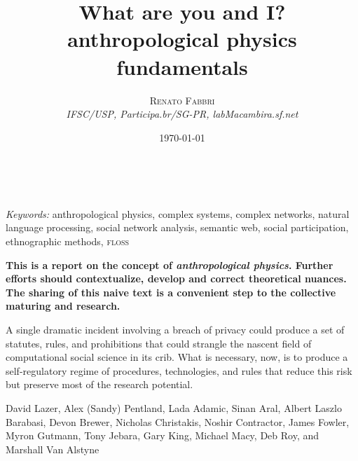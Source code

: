 \documentclass[a4paper, 11pt]{article} %
\title{\textbf{What are you and I?}\\ %
anthropological physics fundamentals} %
\author{\textsc{Renato Fabbri} %
\\{\textit{IFSC/USP, Participa.br/SG-PR, labMacambira.sf.net}}} %
\date{\today} %
\makeatletter
\newcommand{\floss}{\textsc{floss}}
\renewcommand{\maketitle}{ %
\begin{flushright} %
{\LARGE\@title} %

\vspace{50pt} %

{\large\@author} %
\\\@date %

\vspace{40pt} %
\end{flushright}
}
\makeatother
\begin{document}
\maketitle %



%
%
%

\hspace*{3,6mm}\textit{Keywords:} anthropological physics, complex systems, complex networks, natural language processing, social network analysis, semantic web, social participation, ethnographic methods, \floss


\vspace*{1cm}
{\bf This is a report on the concept of \emph{anthropological physics}. Further efforts should contextualize, develop and correct theoretical nuances. The sharing of this naive text is a convenient step to the collective maturing and research.}
\vspace*{.6cm}

\newpage
\epigraph{A single dramatic incident involving a breach of privacy could produce a set of statutes, rules, and prohibitions that could strangle the nascent field of computational social science in its crib. What is necessary, now, is to produce a self-regulatory regime of procedures, technologies, and rules that reduce this risk but preserve most of the research potential.}{David Lazer, Alex (Sandy) Pentland, Lada Adamic, Sinan Aral, Albert Laszlo Barabasi, Devon Brewer, Nicholas Christakis, Noshir Contractor, James Fowler, Myron Gutmann, Tony Jebara, Gary King, Michael Macy, Deb Roy, and Marshall Van Alstyne~\cite{life}}
\end{document}
